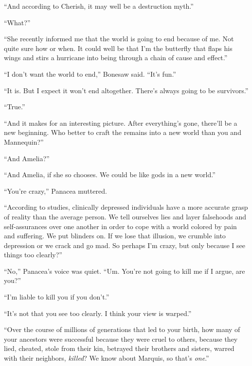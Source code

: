 ``And according to Cherish, it may well be a destruction myth.''



``What?''



``She recently informed me that the world is going to end because of me.  Not quite sure how or when.  It could well be that I'm the butterfly that flaps his wings and stirs a hurricane into being through a chain of cause and effect.''



``I don't want the world to end,'' Bonesaw said.  ``It's fun.''



``It is.  But I expect it won't end altogether.  There's always going to be survivors.''



``True.''



``And it makes for an interesting picture.  After everything's gone, there'll be a new beginning.  Who better to craft the remains into a new world than you and Mannequin?''



``And Amelia?''



``And Amelia, if she so chooses.  We could be like gods in a new world.''



``You're crazy,'' Panacea muttered.



``According to studies, clinically depressed individuals have a more accurate grasp of reality than the average person.  We tell ourselves lies and layer falsehoods and self-assurances over one another in order to cope with a world colored by pain and suffering.  We put blinders on.  If we lose that illusion, we crumble into depression or we crack and go mad.  So perhaps I'm crazy, but only because I see things too clearly?''



``No,'' Panacea's voice was quiet.  ``Um.  You're not going to kill me if I argue, are you?''



``I'm liable to kill you if you don't.''



``It's not that you see too clearly.  I think your view is warped.''



``Over the course of millions of generations that led to your birth, how many of your ancestors were successful because they were cruel to others, because they lied, cheated, stole from their kin, betrayed their brothers and sisters, warred with their neighbors, \emph{killed}?  We know about Marquis, so that's \emph{one}.''



